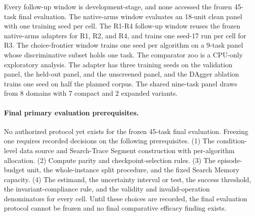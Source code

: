 Every follow-up window is development-stage, and none accessed the frozen 45-task final evaluation. The native-arms window evaluates an 18-unit clean panel with one training seed per cell. The R1-R4 follow-up window reuses the frozen native-arms adapters for R1, R2, and R4, and trains one seed-17 run per cell for R3. The choice-frontier window trains one seed per algorithm on a 9-task panel whose discriminative subset holds one task. The comparator zoo is a CPU-only exploratory analysis. The adapter has three training seeds on the validation panel, the held-out panel, and the unscreened panel, and the DAgger ablation trains one seed on half the planned corpus. The shared nine-task panel draws from 8 domains with 7 compact and 2 expanded variants.

\paragraph{Final primary evaluation prerequisites.}
No authorized protocol yet exists for the frozen 45-task final evaluation. Freezing one requires recorded decisions on the following prerequisites. (1) The condition-level data source and Search-Trace Segment construction with per-algorithm allocation. (2) Compute parity and checkpoint-selection rules. (3) The episode-budget unit, the whole-instance split procedure, and the fixed Search Memory capacity. (4) The estimand, the uncertainty interval or test, the success threshold, the invariant-compliance rule, and the validity and invalid-operation denominators for every cell. Until these choices are recorded, the final evaluation protocol cannot be frozen and no final comparative efficacy finding exists.

